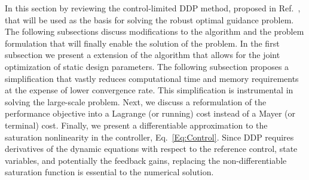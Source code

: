 In this section by reviewing the control-limited DDP method, proposed in Ref.~\cite{DDP_ControlLimited}, that will be used as the basis for solving the robust optimal guidance problem. The following subsections discuss modifications to the algorithm and the problem formulation that will finally enable the solution of the problem. In the first subsection we present a extension of the algorithm that allows for the joint optimization of static design parameters. The following subsection proposes a simplification that vastly reduces computational time and memory requirements at the expense of lower convergence rate. This simplification is instrumental in solving the large-scale problem. Next, we discuss a reformulation of the performance objective into a Lagrange (or running) cost instead of a Mayer (or terminal) cost. Finally, we present a differentiable approximation to the saturation nonlinearity in the controller, Eq.~\eqref{Eq:Control}. Since DDP requires derivatives of the dynamic equations with respect to the reference control, state variables, and potentially the feedback gains, replacing the non-differentiable saturation function is essential to the numerical solution.

